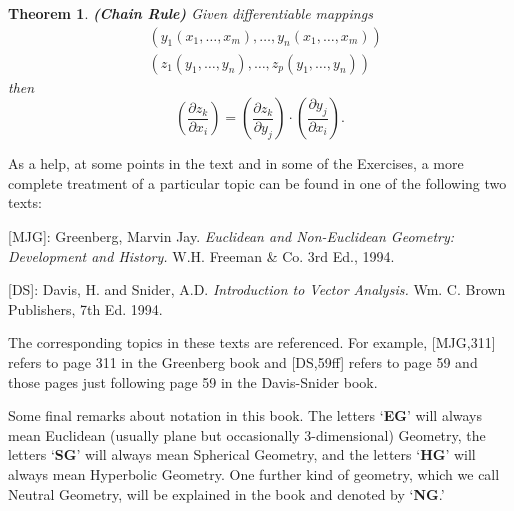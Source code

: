 \documentclass{article}%
\newtheorem{theorem}{Theorem}
\begin{document}
\begin{theorem}
\textbf{(Chain Rule)} Given differentiable mappings%
\begin{align*}
&  \left(  y_{1}\left(  x_{1},\ldots,x_{m}\right)  ,\ldots,y_{n}\left(
x_{1},\ldots,x_{m}\right)  \right) \\
&  \left(  z_{1}\left(  y_{1},\ldots,y_{n}\right)  ,\ldots,z_{p}\left(
y_{1},\ldots,y_{n}\right)  \right)
\end{align*}
then%
\[
\left(  \frac{\partial z_{k}}{\partial x_{i}}\right)  =\left(  \frac{\partial
z_{k}}{\partial y_{j}}\right)  \cdot\left(  \frac{\partial y_{j}}{\partial
x_{i}}\right)  .
\]

\end{theorem}

As a help, at some points in the text and in some of the Exercises, a more
complete treatment of a particular topic can be found in one of the following
two texts:

[MJG]: Greenberg, Marvin Jay. \textit{Euclidean and Non-Euclidean Geometry:
Development and History.} W.H. Freeman \& Co. 3rd Ed., 1994.

[DS]: Davis, H. and Snider, A.D. \textit{Introduction to Vector Analysis.} Wm.
C. Brown Publishers, 7th Ed. 1994.

The corresponding topics in these texts are referenced. For example, [MJG,311]
refers to page 311 in the Greenberg book and [DS,59ff] refers to page 59 and
those pages just following page 59 in the Davis-Snider book.

Some final remarks about notation in this book. The letters `\textbf{EG}' will
always mean Euclidean (usually plane but occasionally $3$-dimensional)
Geometry, the letters `\textbf{SG}' will always mean Spherical Geometry, and
the letters `\textbf{HG}' will always mean Hyperbolic Geometry. One further
kind of geometry, which we call Neutral Geometry, will be explained in the
book and denoted by `\textbf{NG}.'
\end{document}
